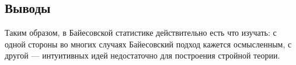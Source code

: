 \subsection{Выводы}

Таким образом, в Байесовской статистике действительно есть что изучать:
с одной стороны во многих случаях Байесовский подход кажется осмысленным,
с другой --- интуитивных идей недостаточно для построения стройной теории.

